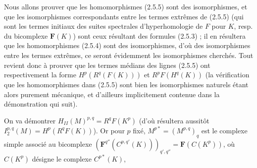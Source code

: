 Nous allons prouver que les homomorphismes (2.5.5) sont des isomorphismes, et
que les isomorphismes correspondants entre les termes extrêmes de (2.5.5)
(qui sont les termes initiaux des suites spectrales d'hyperhomologie de $F$
pour $K$, resp. du bicomplexe $\mathbf F(K)$) sont ceux résultant des formules
(2.5.3) ; il en résultera que les homomorphismes (2.5.4) sont des
isomorphismes, d'où des isomorphismes entre les termes extrêmes, ce seront
évidemment les isomorphismes cherchés. Tout revient donc à prouver que les
termes médians des lignes (2.5.5) ont respectivement la forme
$H^p(R^q(F(K)))$ et $R^pF(H^q(K))$ (la vérification que les homomorphismes
dans (2.5.5) sont bien les isomorphismes naturels étant alors purement
mécanique, et d'ailleurs implicitement contenue dans la démonstration qui
suit).

On va démontrer $H_{II}(M)^{p,q}=R^qF(K^p)$ (d'où résultera aussitôt
$ I_2^{p,q}(M)=H^p(R^qF(K))$). Or pour $p$ fixé,
$M^{p*}=(M^{p,q})_q$ est le complexe simple associé au bicomplexe
$(\mathbf F^{q''}(C^{p,q'}(K)))_{q',q''}=\mathbf F(C(K^p))$,
où $C(K^p)$ désigne le complexe $C^{p*}(K)$,


